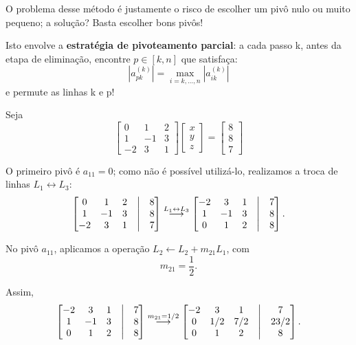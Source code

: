 \documentclass[../numerical_methods.tex]{subfiles}
\begin{document}
O problema desse método é justamente o risco de escolher um pivô nulo ou muito pequeno; a solução? Basta escolher bons pivôs!

Isto envolve a \textbf{estratégia de pivoteamento parcial}: a cada passo k, antes da etapa de eliminação, encontre \(p\in [k, n]\) que satisfaça:
\[
	| a_{pk}^{(k)} | = \max\limits_{i=k, \dotsc , n}| a_{ik}^{(k)} |
\]
e permute as linhas k e p!

\begin{example}
	Seja
	\[
		\begin{bmatrix}
			0  & 1  & 2 \\
			1  & -1 & 3 \\
			-2 & 3  & 1
		\end{bmatrix}\begin{bmatrix}
			x \\
			y \\
			z
		\end{bmatrix} = \begin{bmatrix}
			8 \\
			8 \\
			7
		\end{bmatrix}
	\]

	O primeiro pivô é \(a_{11}=0\); como não é possível utilizá-lo, realizamos a troca de linhas \(L_{1}\leftrightarrow L_{3}\):
	\[
		\begin{bmatrix}
			0  & 1  & 2 & \bigm| & 8 \\
			1  & -1 & 3 & \bigm| & 8 \\
			-2 & 3  & 1 & \bigm| & 7
		\end{bmatrix}
		\stackrel{L_{1}\leftrightarrow L_{3}}{\longrightarrow}
		\begin{bmatrix}
			-2 & 3  & 1 & \bigm| & 7 \\
			1  & -1 & 3 & \bigm| & 8 \\
			0  & 1  & 2 & \bigm| & 8
		\end{bmatrix}.
	\]

	No pivô \(a_{11}\), aplicamos a operação
	\(L_{2}\leftarrow L_{2}+m_{21}L_{1}\), com
	\[
		m_{21}=\frac{1}{2}.
	\]

	Assim,
	\[
		\begin{bmatrix}
			-2 & 3  & 1 & \bigm| & 7 \\
			1  & -1 & 3 & \bigm| & 8 \\
			0  & 1  & 2 & \bigm| & 8
		\end{bmatrix}
		\stackrel{m_{21}=1/2}{\longrightarrow}
		\begin{bmatrix}
			-2 & 3   & 1   & \bigm| & 7    \\
			0  & 1/2 & 7/2 & \bigm| & 23/2 \\
			0  & 1   & 2   & \bigm| & 8
		\end{bmatrix}.
	\]


\end{example}
\end{document}

